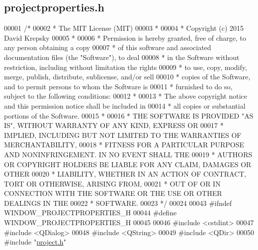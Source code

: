 \hypertarget{projectproperties_8h_source}{}\subsection{projectproperties.\+h}
\label{projectproperties_8h_source}

\begin{DoxyCode}
00001 \textcolor{comment}{/*}
00002 \textcolor{comment}{ * The MIT License (MIT)}
00003 \textcolor{comment}{ *}
00004 \textcolor{comment}{ * Copyright (c) 2015 David Krepsky}
00005 \textcolor{comment}{ *}
00006 \textcolor{comment}{ * Permission is hereby granted, free of charge, to any person obtaining a copy}
00007 \textcolor{comment}{ * of this software and associated documentation files (the "Software"), to deal}
00008 \textcolor{comment}{ * in the Software without restriction, including without limitation the rights}
00009 \textcolor{comment}{ * to use, copy, modify, merge, publish, distribute, sublicense, and/or sell}
00010 \textcolor{comment}{ * copies of the Software, and to permit persons to whom the Software is}
00011 \textcolor{comment}{ * furnished to do so, subject to the following conditions:}
00012 \textcolor{comment}{ *}
00013 \textcolor{comment}{ * The above copyright notice and this permission notice shall be included in}
00014 \textcolor{comment}{ * all copies or substantial portions of the Software.}
00015 \textcolor{comment}{ *}
00016 \textcolor{comment}{ * THE SOFTWARE IS PROVIDED "AS IS", WITHOUT WARRANTY OF ANY KIND, EXPRESS OR}
00017 \textcolor{comment}{ * IMPLIED, INCLUDING BUT NOT LIMITED TO THE WARRANTIES OF MERCHANTABILITY,}
00018 \textcolor{comment}{ * FITNESS FOR A PARTICULAR PURPOSE AND NONINFRINGEMENT. IN NO EVENT SHALL THE}
00019 \textcolor{comment}{ * AUTHORS OR COPYRIGHT HOLDERS BE LIABLE FOR ANY CLAIM, DAMAGES OR OTHER}
00020 \textcolor{comment}{ * LIABILITY, WHETHER IN AN ACTION OF CONTRACT, TORT OR OTHERWISE, ARISING FROM,}
00021 \textcolor{comment}{ * OUT OF OR IN CONNECTION WITH THE SOFTWARE OR THE USE OR OTHER DEALINGS IN THE}
00022 \textcolor{comment}{ * SOFTWARE.}
00023 \textcolor{comment}{ */}
00024 
00043 \textcolor{preprocessor}{#ifndef WINDOW\_PROJECTPROPERTIES\_H}
00044 \textcolor{preprocessor}{#define WINDOW\_PROJECTPROPERTIES\_H}
00045 
00046 \textcolor{preprocessor}{#include <cstdint>}
00047 \textcolor{preprocessor}{#include <QDialog>}
00048 \textcolor{preprocessor}{#include <QString>}
00049 \textcolor{preprocessor}{#include <QDir>}
00050 \textcolor{preprocessor}{#include "\hyperlink{project_8h}{project.h}"}

\end{DoxyCode}

